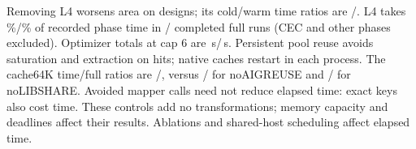 Removing L4 worsens area on \EggWorseCount{} designs; its cold/warm time ratios are \ColdNoEggRatio{}/\WarmNoEggRatio{}. L4 takes \TimeEggShare\%/\WarmTimeEggShare\% of recorded phase time in \ColdPhaseRuns{}/\WarmPhaseRuns{} completed full runs (CEC and other phases excluded). Optimizer totals at cap 6 are \ColdMainSeconds\,s/\WarmMainSeconds\,s. Persistent pool reuse avoids saturation and extraction on hits; native caches restart in each process. The cache64K time/full ratios are \CacheCapacityColdRatio{}/\CacheCapacityWarmRatio{}, versus \AigReuseColdRatio{}/\AigReuseWarmRatio{} for noAIGREUSE and \LibraryShareColdRatio{}/\LibraryShareWarmRatio{} for noLIBSHARE. \BuildCaseExample{} Avoided mapper calls need not reduce elapsed time: exact keys also cost time. These controls add no transformations; memory capacity and deadlines affect their results. \CacheDeadlineExample{} Ablations and shared-host scheduling affect elapsed time.


